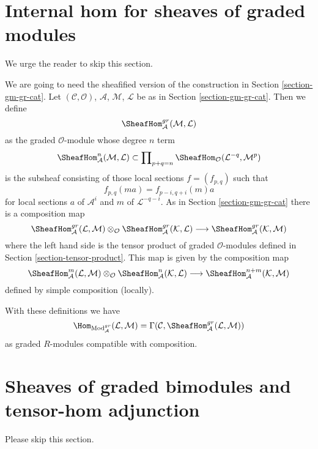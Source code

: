 \section{Internal hom for sheaves of graded modules}
\label{section-internal-hom-graded}

\noindent
We urge the reader to skip this section.

\medskip\noindent
We are going to need the sheafified version of the construction
in Section \ref{section-gm-gr-cat}.
Let $(\mathcal{C}, \mathcal{O})$, $\mathcal{A}$,
$\mathcal{M}$, $\mathcal{L}$ be as in Section \ref{section-gm-gr-cat}.
Then we define
$$
\SheafHom^{gr}_\mathcal{A}(\mathcal{M}, \mathcal{L})
$$
as the graded $\mathcal{O}$-module whose degree $n$ term
$$
\SheafHom^n_\mathcal{A}(\mathcal{M}, \mathcal{L})
\subset
\prod\nolimits_{p + q = n}
\SheafHom_\mathcal{O}(\mathcal{L}^{-q}, \mathcal{M}^p)
$$
is the subsheaf consisting of those local sections $f = (f_{p, q})$ such that
$$
f_{p, q}(m a) = f_{p - i, q + i}(m)a
$$
for local sections $a$ of $\mathcal{A}^i$ and
$m$ of $\mathcal{L}^{-q - i}$. As in Section \ref{section-gm-gr-cat}
there is a composition map
$$
\SheafHom^{gr}_\mathcal{A}(\mathcal{L}, \mathcal{M}) \otimes_\mathcal{O}
\SheafHom^{gr}_\mathcal{A}(\mathcal{K}, \mathcal{L})
\longrightarrow
\SheafHom^{gr}_\mathcal{A}(\mathcal{K}, \mathcal{M})
$$
where the left hand side is the tensor product of graded $\mathcal{O}$-modules
defined in Section \ref{section-tensor-product}.
This map is given by the composition map
$$
\SheafHom^m_\mathcal{A}(\mathcal{L}, \mathcal{M}) \otimes_\mathcal{O}
\SheafHom^n_\mathcal{A}(\mathcal{K}, \mathcal{L}) \longrightarrow
\SheafHom^{n + m}_\mathcal{A}(\mathcal{K}, \mathcal{M})
$$
defined by simple composition (locally).

\medskip\noindent
With these definitions we have
$$
\Hom_{\text{Mod}^{gr}_\mathcal{A}}(\mathcal{L}, \mathcal{M}) =
\Gamma(\mathcal{C}, \SheafHom^{gr}_\mathcal{A}(\mathcal{L}, \mathcal{M}))
$$
as graded $R$-modules compatible with composition.







\section{Sheaves of graded bimodules and tensor-hom adjunction}
\label{section-graded-bimodules}

\noindent
Please skip this section.

